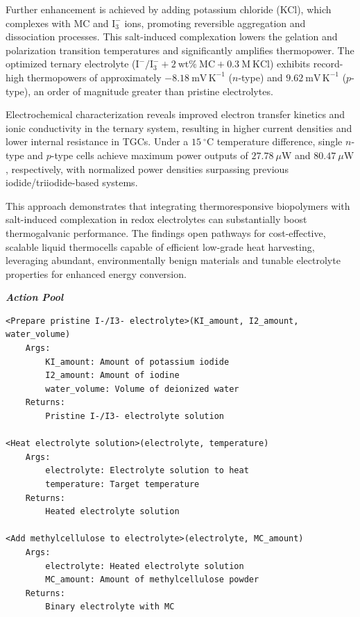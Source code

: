 \begin{tcolorbox}[
    breakable,
    title=Example of Wet Experiment in Material,
    colback=LighterGray,
    colframe=DeepPurple,
    colbacktitle=DeepPurple,
    coltitle=White,
]
Further enhancement is achieved by adding potassium chloride (KCl), which complexes with MC and $\mathrm{I}_3^-$ ions, promoting reversible aggregation and dissociation processes. This salt-induced complexation lowers the gelation and polarization transition temperatures and significantly amplifies thermopower. The optimized ternary electrolyte ($\mathrm{I}^-/\mathrm{I}_3^- + 2~\mathrm{wt}\%~\mathrm{MC} + 0.3~\mathrm{M}~\mathrm{KCl}$) exhibits record-high thermopowers of approximately $-8.18~\mathrm{mV\,K}^{-1}$ ($n$-type) and $9.62~\mathrm{mV\,K}^{-1}$ ($p$-type), an order of magnitude greater than pristine electrolytes.

Electrochemical characterization reveals improved electron transfer kinetics and ionic conductivity in the ternary system, resulting in higher current densities and lower internal resistance in TGCs. Under a $15~^\circ\mathrm{C}$ temperature difference, single $n$-type and $p$-type cells achieve maximum power outputs of $27.78~\mu\mathrm{W}$ and $80.47~\mu\mathrm{W}$, respectively, with normalized power densities surpassing previous iodide/triiodide-based systems.

This approach demonstrates that integrating thermoresponsive biopolymers with salt-induced complexation in redox electrolytes can substantially boost thermogalvanic performance. The findings open pathways for cost-effective, scalable liquid thermocells capable of efficient low-grade heat harvesting, leveraging abundant, environmentally benign materials and tunable electrolyte properties for enhanced energy conversion.

\textbf{\emph{\textcolor{DeepPurple}{Action Pool}}}

\begin{lstlisting}
<Prepare pristine I-/I3- electrolyte>(KI_amount, I2_amount, water_volume)
    Args:
        KI_amount: Amount of potassium iodide
        I2_amount: Amount of iodine
        water_volume: Volume of deionized water
    Returns:
        Pristine I-/I3- electrolyte solution

<Heat electrolyte solution>(electrolyte, temperature)
    Args:
        electrolyte: Electrolyte solution to heat
        temperature: Target temperature
    Returns:
        Heated electrolyte solution

<Add methylcellulose to electrolyte>(electrolyte, MC_amount)
    Args:
        electrolyte: Heated electrolyte solution
        MC_amount: Amount of methylcellulose powder
    Returns:
        Binary electrolyte with MC


\end{lstlisting}
\end{tcolorbox}
